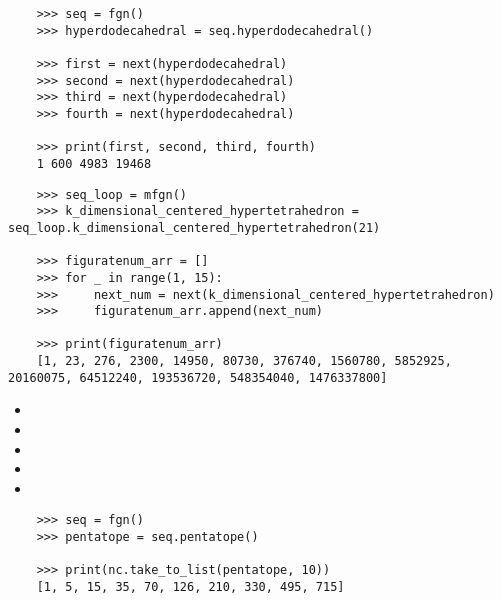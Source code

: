 \documentclass{article}
\begin{document}
\begin{multicols}{2}
  \begin{tcolorbox}[title= Computing FigurateNum Without Using a Loop]
    \begin{lstlisting}
    >>> seq = fgn()
    >>> hyperdodecahedral = seq.hyperdodecahedral()

    >>> first = next(hyperdodecahedral)
    >>> second = next(hyperdodecahedral)
    >>> third = next(hyperdodecahedral)
    >>> fourth = next(hyperdodecahedral)

    >>> print(first, second, third, fourth)
    1 600 4983 19468
    \end{lstlisting}
  \end{tcolorbox}

  \begin{tcolorbox}[title = Example Using a Specific Class with a Loop]
    \begin{lstlisting}
    >>> seq_loop = mfgn()
    >>> k_dimensional_centered_hypertetrahedron = seq_loop.k_dimensional_centered_hypertetrahedron(21)

    >>> figuratenum_arr = []
    >>> for _ in range(1, 15):
    >>>     next_num = next(k_dimensional_centered_hypertetrahedron)
    >>>     figuratenum_arr.append(next_num)

    >>> print(figuratenum_arr)
    [1, 23, 276, 2300, 14950, 80730, 376740, 1560780, 5852925, 20160075, 64512240, 193536720, 548354040, 1476337800]
    \end{lstlisting}
  \end{tcolorbox}

\end{multicols}

\begin{multicols}{2}
  \begin{tcolorbox}[title= NumberCollector Class: Method Summary]
    \begin{itemize}[noitemsep, topsep=0pt]
      \item {}
      \item {}
      \item {}
      \item {}
      \item {}
    \end{itemize}
  \end{tcolorbox}

  \begin{tcolorbox}[title= Working with the NumberCollector Class]
    \begin{lstlisting}
    >>> seq = fgn()
    >>> pentatope = seq.pentatope()

    >>> print(nc.take_to_list(pentatope, 10))
    [1, 5, 15, 35, 70, 126, 210, 330, 495, 715]
    \end{lstlisting}
  \end{tcolorbox}
\end{multicols}
\end{document}
